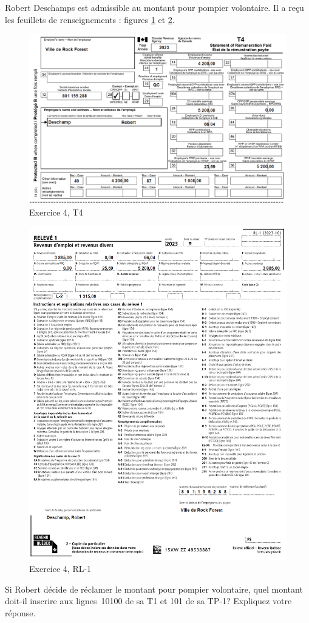 \begin{question}
	Robert Deschamps est admissible au montant pour pompier volontaire. Il a reçu les feuillets de renseignements : figures \ref{fig:chap3Exercice4T4} et \ref{fig:chap3Exercice4RL1}.
	\begin{figure}
		\centering
		\includegraphics[width=.9\textwidth]{exercice/3-4/Q8/T4.png}
		\caption{Exercice 4, T4}
		\label{fig:chap3Exercice4T4}
	\end{figure}
	\begin{figure}
		\centering
		\includegraphics[width=.9\textwidth]{exercice/3-4/Q8/RL1.png}
		\caption{Exercice 4, RL-1}
		\label{fig:chap3Exercice4RL1}
	\end{figure}
	
	Si Robert décide de réclamer le montant pour pompier volontaire, quel montant doit-il inscrire aux lignes~10100 de sa T1 et 101 de sa
	TP-1? Expliquez votre réponse.
\end{question}
